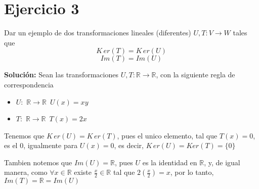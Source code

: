 \section*{Ejercicio 3}

Dar un ejemplo de dos transformaciones lineales (diferentes) $U,T : V \rightarrow W$ tales que
$$ K\,er(T) = K\,er(U) $$
$$ Im(T) = Im(U) $$

\noindent \textbf{Solución:}
Sean las transformaciones $U,T: \mathbb{R} \longrightarrow \mathbb{R}$, 
con la siguiente regla de correspondencia

\begin{itemize}
    \item $U:$ $\mathbb{R} \longrightarrow \mathbb{R}$ $ \,U(x)=x y$

    \item $T:$ $\mathbb{R} \longrightarrow \mathbb{R}$ $ \,T(x) = 2x$
\end{itemize}

\noindent Tenemos que $K\,er(U)=K\,er(T)$, pues el unico elemento, tal que $T(x)=0$, es el $0$,
igualmente para $U(x)=0$, es decir, $K\,er(U)=Ker(T)=\{0\}$ 

\noindent Tambien notemos que $Im(U)=\mathbb{R}$, pues $U$ es la identidad en $\mathbb{R}$, y, de igual manera,
como $\forall x \in \mathbb{R}$ existe $\frac{x}{2} \in \mathbb{R}$ tal que 
$2(\frac{x}{2})=x$, por lo tanto, $Im(T)= \mathbb{R} =Im(U)$
